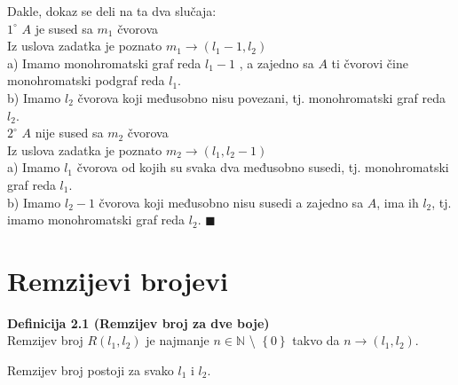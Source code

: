 \documentclass[12pt,a4paper]{article}
\begin{document}
	\vspace{-0.4em}
	\noindent Dakle, dokaz se deli na ta dva slučaja:\\


	\noindent $1^\circ $ $A$ je sused sa $m_{1}$ čvorova\\
	
	Iz uslova zadatka je poznato $m_{1} \rightarrow (l_{1}-1, l_{2})$\\
	\indent a) Imamo monohromatski graf reda $l_{1}-1$ , a zajedno sa $A$ ti čvorovi čine monohromatski podgraf reda  $l_{1}$. \\
	\indent b) Imamo $l_{2}$ čvorova koji međusobno nisu povezani, tj. monohromatski graf reda $l_{2}$.\\

	\vspace{0.5em}
	\noindent $2^\circ$ $A$ nije sused  sa  $m_{2}$ čvorova\\
	
	Iz uslova zadatka je poznato $m_{2} \rightarrow (l_{1}, l_{2}-1)$\\
	\indent a) Imamo $l_{1}$ čvorova od kojih su svaka dva međusobno susedi, tj. monohromatski graf reda $l_{1}$.\\
	\indent b) Imamo $l_{2}-1$ čvorova koji međusobno nisu susedi a zajedno sa $A$, ima ih $l_{2}$, tj. imamo monohromatski graf reda $l_{2}$. \hspace{0.5em}$\blacksquare$\\
	
	\newpage
	
	
	\section{Remzijevi brojevi}
	\vspace{1em}
	\begin{mdframed}
	{\fontsize{12pt}{12pt}\textbf{Definicija 2.1 (Remzijev broj za dve boje)}}
	\vspace{0.5em}	
	\\
	Remzijev broj $R(l_{1}, l_{2})$ je najmanje $n \in \mathbb{N}$ \textbackslash {} $\left\lbrace 0\right\rbrace $ takvo da $n\rightarrow(l_{1}, l_{2})$.
	\end{mdframed}
	
	\noindent Remzijev broj postoji za svako $l_1$ i $l_2$.
	
	\vspace{0.7em}
	
\end{document}
